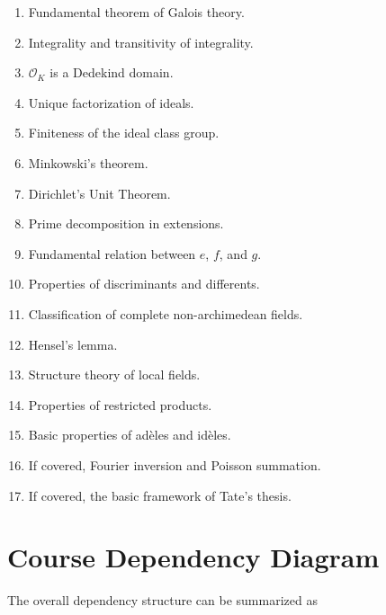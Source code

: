 \documentclass[11pt]{article}
\begin{document}
\begin{enumerate}
    \item Fundamental theorem of Galois theory.
    \item Integrality and transitivity of integrality.
    \item $\mathcal{O}_K$ is a Dedekind domain.
    \item Unique factorization of ideals.
    \item Finiteness of the ideal class group.
    \item Minkowski's theorem.
    \item Dirichlet's Unit Theorem.
    \item Prime decomposition in extensions.
    \item Fundamental relation between $e$, $f$, and $g$.
    \item Properties of discriminants and differents.
    \item Classification of complete non-archimedean fields.
    \item Hensel's lemma.
    \item Structure theory of local fields.
    \item Properties of restricted products.
    \item Basic properties of adèles and idèles.
    \item If covered, Fourier inversion and Poisson summation.
    \item If covered, the basic framework of Tate's thesis.
\end{enumerate}

\section{Course Dependency Diagram}

The overall dependency structure can be summarized as
\end{document}
